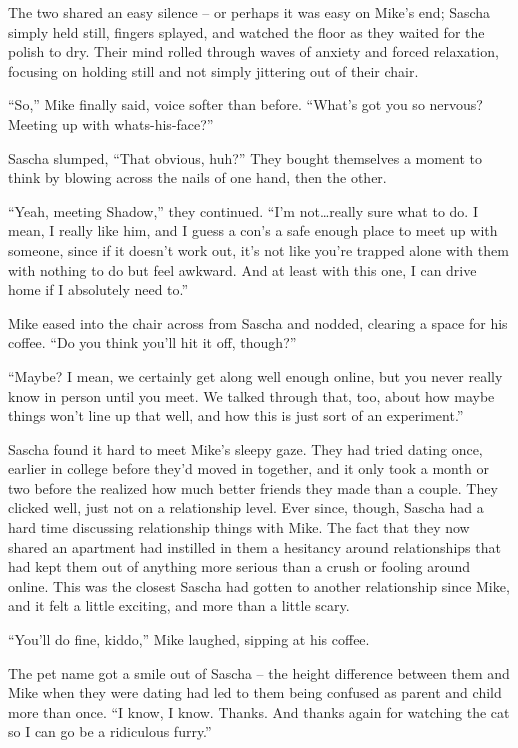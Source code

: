 The two shared an easy silence -- or perhaps it was easy on Mike's end; Sascha simply held still, fingers splayed, and watched the floor as they waited for the polish to dry. Their mind rolled through waves of anxiety and forced relaxation, focusing on holding still and not simply jittering out of their chair.

``So,'' Mike finally said, voice softer than before. ``What's got you so nervous? Meeting up with whats-his-face?''

Sascha slumped, ``That obvious, huh?'' They bought themselves a moment to think by blowing across the nails of one hand, then the other.

``Yeah, meeting Shadow,'' they continued. ``I'm not\ldots{}really sure what to do. I mean, I really like him, and I guess a con's a safe enough place to meet up with someone, since if it doesn't work out, it's not like you're trapped alone with them with nothing to do but feel awkward. And at least with this one, I can drive home if I absolutely need to.''

Mike eased into the chair across from Sascha and nodded, clearing a space for his coffee. ``Do you think you'll hit it off, though?''

``Maybe? I mean, we certainly get along well enough online, but you never really know in person until you meet. We talked through that, too, about how maybe things won't line up that well, and how this is just sort of an experiment.''

Sascha found it hard to meet Mike's sleepy gaze. They had tried dating once, earlier in college before they'd moved in together, and it only took a month or two before the realized how much better friends they made than a couple. They clicked well, just not on a relationship level. Ever since, though, Sascha had a hard time discussing relationship things with Mike. The fact that they now shared an apartment had instilled in them a hesitancy around relationships that had kept them out of anything more serious than a crush or fooling around online. This was the closest Sascha had gotten to another relationship since Mike, and it felt a little exciting, and more than a little scary.

``You'll do fine, kiddo,'' Mike laughed, sipping at his coffee.

The pet name got a smile out of Sascha -- the height difference between them and Mike when they were dating had led to them being confused as parent and child more than once. ``I know, I know. Thanks. And thanks again for watching the cat so I can go be a ridiculous furry.''

